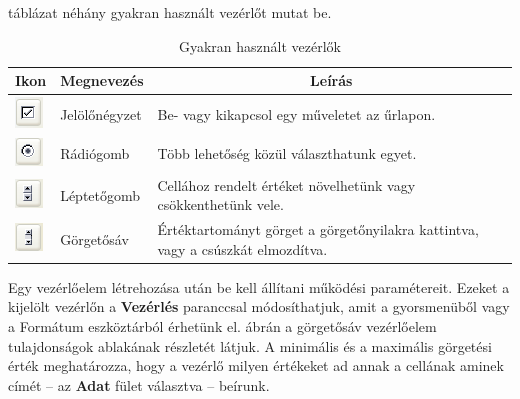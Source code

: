  táblázat néhány gyakran használt
vezérlőt mutat be.

\begin{table}[!h]
\begin{center}
\caption{Gyakran használt vezérlők}\label{GyakranHasználtVezérlők}
\begin{tabular}{|m{1cm}|m{2.7cm}|b{8cm}|}
\hline
\multicolumn{1}{|c|}{\textbf{Ikon}}&
\multicolumn{1}{c|}{\textbf{Megnevezés}}&
\multicolumn{1}{c|}{\textbf{Leírás}} \\
\hline
\centering \includegraphics[width=0.741cm]{oocalcv2-img147.png} &
Jelölőnégyzet & Be- vagy kikapcsol egy műveletet az űrlapon.\\ \hline
\centering \includegraphics[width=0.741cm]{oocalcv2-img148.png} &
Rádiógomb & Több lehetőség közül választhatunk egyet.\\ \hline
\centering \includegraphics[width=0.741cm]{oocalcv2-img149.png} &
Léptetőgomb & Cellához rendelt értéket növelhetünk vagy csökkenthetünk
vele.\\ \hline
\centering \includegraphics[width=0.741cm]{oocalcv2-img150.png} &
Görgetősáv & Értéktartományt görget a görgetőnyilakra kattintva, vagy a
csúszkát elmozdítva.\\ \hline
\end{tabular}
\end{center}
\end{table}

Egy vezérlőelem létrehozása után be kell állítani
működési paramétereit. Ezeket a kijelölt vezérlőn a
\textbf{Vezérlés }paranccsal módosíthatjuk, amit a
gyorsmenüből vagy a Formátum eszköztárból érhetünk
el.  ábrán a görgetősáv vezérlőelem
tulajdonságok ablakának részletét látjuk. A minimális és
a maximális görgetési érték meghatározza, hogy a
vezérlő milyen értékeket ad annak a cellának aminek
címét --  az \textbf{Adat} fület választva --  beírunk.

